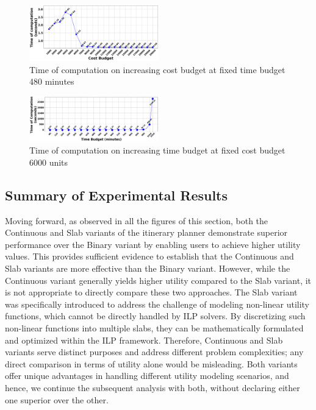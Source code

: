 \begin{figure}[H]
    \centering
    \includegraphics[width=0.50\textwidth]{plots/costbudgetvstoc.png}
    \caption{Time of computation on increasing cost budget at fixed time budget 480 minutes}
    \label{fig:costbudgetvstoc}
\end{figure}

\begin{figure}[H]
    \centering
    \includegraphics[width=0.50\textwidth]{plots/timebudgetvstoc.png}
    \caption{Time of computation on increasing time budget at fixed cost budget 6000 units}
    \label{fig:timebudgetvstoc}
\end{figure}




\subsection{Summary of Experimental Results}

Moving forward, as observed in all the figures of this section, both the Continuous and Slab variants of the itinerary planner demonstrate superior performance over the Binary variant by enabling users to achieve higher utility values. This provides sufficient evidence to establish that the Continuous and Slab variants are more effective than the Binary variant. However, while the Continuous variant generally yields higher utility compared to the Slab variant, it is not appropriate to directly compare these two approaches. The Slab variant was specifically introduced to address the challenge of modeling non-linear utility functions, which cannot be directly handled by ILP solvers. By discretizing such non-linear functions into multiple slabs, they can be mathematically formulated and optimized within the ILP framework. Therefore, Continuous and Slab variants serve distinct purposes and address different problem complexities; any direct comparison in terms of utility alone would be misleading. Both variants offer unique advantages in handling different utility modeling scenarios, and hence, we continue the subsequent analysis with both, without declaring either one superior over the other.
